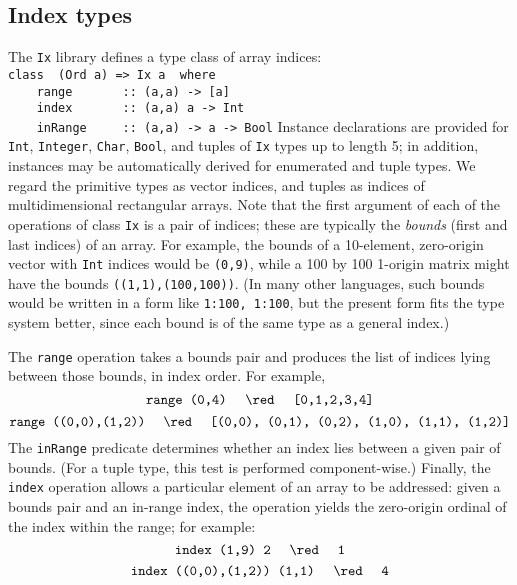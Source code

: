 \subsection{Index types}
The \mbox{\tt Ix} library defines a type class of array indices:
\bprog
\mbox{\tt class\ \ (Ord\ a)\ =>\ Ix\ a\ \ where}\\
\mbox{\tt \ \ \ \ range\ \ \ \ \ \ \ ::\ (a,a)\ ->\ [a]}\\
\mbox{\tt \ \ \ \ index\ \ \ \ \ \ \ ::\ (a,a)\ a\ ->\ Int}\\
\mbox{\tt \ \ \ \ inRange\ \ \ \ \ ::\ (a,a)\ ->\ a\ ->\ Bool}
\eprog
Instance declarations are provided for \mbox{\tt Int}, \mbox{\tt Integer}, \mbox{\tt Char},
\mbox{\tt Bool}, and tuples of \mbox{\tt Ix} types up to length 5; in addition, instances may be
automatically derived for enumerated and tuple types.  We regard the
primitive types as vector indices, and tuples as indices of
multidimensional rectangular arrays.  Note that the first argument of
each of the operations of class \mbox{\tt Ix} is a pair of indices; these are
typically the {\em bounds} (first and last indices) of an array.  For
example, the bounds of a 10-element, zero-origin vector with \mbox{\tt Int}
indices would be \mbox{\tt (0,9)}, while a 100 by 100 1-origin matrix might have
the bounds \mbox{\tt ((1,1),(100,100))}.  (In many other languages, such bounds
would be written in a form like \mbox{\tt 1:100,\ 1:100}, but the present
form fits the type system better, since each bound is of the same
type as a general index.)

The \mbox{\tt range} operation takes a bounds pair and produces the list of
indices lying between those bounds, in index order.  For example,
\[ \mbox{\tt range\ (0,4)}\ \ \ \ \red\ \ \ \  \mbox{\tt [0,1,2,3,4]} \]
\[ \mbox{\tt range\ ((0,0),(1,2))}\ \ \ \ \red\ \ \ \ %
\mbox{\tt [(0,0),\ (0,1),\ (0,2),\ (1,0),\ (1,1),\ (1,2)]} \]
The \mbox{\tt inRange} predicate determines whether an index lies between a given
pair of bounds.  (For a tuple type, this test is performed
component-wise.)  Finally, the \mbox{\tt index} operation allows
a particular element of an array to be addressed: given a bounds pair and an
in-range index, the operation yields the zero-origin ordinal of the
index within the range; for example:
\[ \mbox{\tt index\ (1,9)\ 2}\ \ \ \ \red\ \ \ \ \mbox{\tt 1} \]
\[ \mbox{\tt index\ ((0,0),(1,2))\ (1,1)}\ \ \ \ \red\ \ \ \ \mbox{\tt 4} \]

